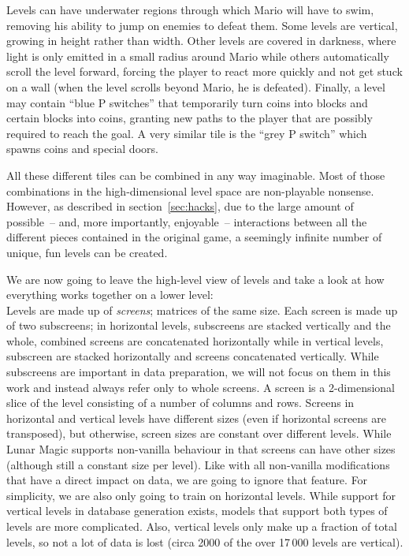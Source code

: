 Levels can have underwater regions through which Mario will have to
swim, removing his ability to jump on enemies to defeat them. Some
levels are vertical, growing in height rather than width. Other levels
are covered in darkness, where light is only emitted in a small radius
around Mario while others automatically scroll the level forward,
forcing the player to react more quickly and not get stuck on a wall
(when the level scrolls beyond Mario, he is defeated). Finally, a
level may contain ``blue P switches'' that temporarily turn coins into
blocks and certain blocks into coins, granting new paths to the player
that are possibly required to reach the goal. A very similar tile is
the ``grey P switch'' which spawns coins and special doors.

All these different tiles can be combined in any way imaginable. Most
of those combinations in the high-dimensional level space are
non-playable nonsense. However, as described in
section~\ref{sec:hacks}, due to the large amount of possible~-- and,
more importantly, enjoyable~-- interactions between all the different
pieces contained in the original game, a seemingly infinite number of
unique, fun levels can be created.
\medskip

We are now going to leave the high-level view of levels and take a
look at how everything works together on a lower level: \\
Levels are made up of \emph{screens}; matrices of the same size. Each
screen is made up of two subscreens; in horizontal levels, subscreens
are stacked vertically and the whole, combined screens are
concatenated horizontally while in vertical levels, subscreen are
stacked horizontally and screens concatenated vertically. While
subscreens are important in data preparation, we will not focus on
them in this work and instead always refer only to whole screens. A
screen is a 2-dimensional slice of the level consisting of a number of
columns and rows. Screens in horizontal and vertical levels have
different sizes (even if horizontal screens are transposed), but
otherwise, screen sizes are constant over different levels. While
Lunar Magic supports non-vanilla behaviour in that screens can have
other sizes (although still a constant size per level). Like with all
non-vanilla modifications that have a direct impact on data, we are
going to ignore that feature. For simplicity, we are also only going
to train on horizontal levels. While support for vertical levels in
database generation exists, models that support both types of levels
are more complicated. Also, vertical levels only make up a fraction of
total levels, so not a lot of data is lost (circa 2000 of the over
17\,000 levels are vertical).

